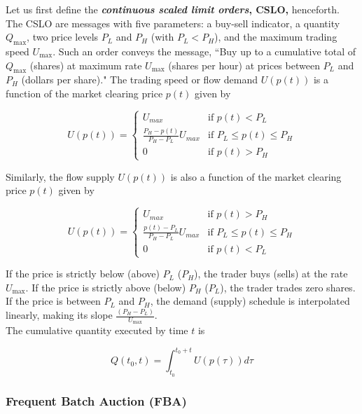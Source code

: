 \documentclass{article}
\begin{document}
Let us first define the \textbf{\textit{continuous scaled limit orders}, CSLO,} henceforth. The CSLO are messages with five parameters: a buy-sell indicator, a quantity $Q_{\max}$, two price levels $P_L$ and $P_H$ (with $P_L < P_H$), and the maximum trading speed $U_{\max}$. Such an order conveys the message, ``Buy up to a cumulative total of $Q_{\max}$ (shares) at maximum rate $U_{\max}$ (shares per hour) at prices between $P_L$ and $P_H$ (dollars per share)." The trading speed or flow demand $U(p(t))$ is a function of the market clearing price $p(t)$ given by 

$$U(p(t)) = \begin{cases}
	U_{max} & \text{if } p(t) < P_L \\
	\frac{P_H - p(t)}{P_H - P_L} U_{max} & \text{if } P_L \leq p(t) \leq P_H \\
	0 & \text{if } p(t) > P_H
\end{cases}$$

Similarly, the flow supply $U(p(t))$ is also a function of the market clearing price $p(t)$ given by 

$$U(p(t)) = \begin{cases}
	U_{max} & \text{if } p(t) > P_H\\
	\frac{p(t) - P_L}{P_H - P_L} U_{max} & \text{if } P_L \leq p(t) \leq P_H \\
	0 & \text{if } p(t) < P_L 
\end{cases}$$

If the price is strictly below (above) $P_L$ ($P_H$), the trader buys (sells) at the rate $U_{\max}$. If the price is strictly above (below) $P_H$ ($P_L$), the trader trades zero shares. If the price is between $P_L$ and $P_H$, the demand (supply) schedule is interpolated linearly, making its slope $\frac{(P_H - P_L)}{U_{\max}}$. \\

The cumulative quantity executed by time $t$ is 

$$Q(t_0,t) = \int_{t_0}^{t_0+t} U(p(\tau)) d\tau$$




\subsubsection{Frequent Batch Auction (FBA)}
\end{document}
